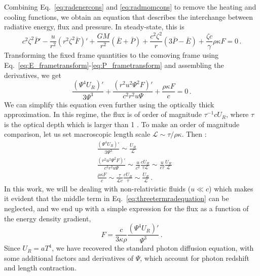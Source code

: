 \documentclass[../main.tex]{subfiles}
\begin{document}
Combining Eq.~\eqref{eq:radenercons} and \eqref{eq:radmomcons} to remove the heating and cooling functions, we obtain an equation that describes the interchange between radiative energy, flux and pressure. In steady-state, this is
\begin{equation}
    c^2\zeta^2\bar{P}'-\frac{u}{r^2}(r^2\zeta^2\bar{F})'
    +\frac{GM}{r^2}(\bar{E}+\bar{P})+\frac{c^2\zeta^2}{r}(3\bar{P}-\bar{E})+\frac{\zeta c}{\gamma}\rho\kappa F=0\,.
\end{equation}
Transforming the fixed frame quantities to the comoving frame using Eq.~\eqref{eq:E_frametransform}-\eqref{eq:P_frametransform} and assembling the derivatives, we get
\begin{equation}\label{eq:threetermradequation}
    \frac{(\Psi^4U_R)'}{3\Psi^3}+\frac{(r^2u^2\Psi^2F)'}{c^2r^2u\Psi}+\frac{\rho\kappa F}{c}=0 \,.
\end{equation}
We can simplify this equation even further using the optically thick approximation. In this regime, the flux is of order of magnitude $\tau^{-1}cU_R$, where $\tau$ is the optical depth which is larger than 1 \citep{Thorne1981}. To make an order of magnitude comparison, let us set macroscopic length scale $\mathscr{L}\sim \tau/\rho\kappa$.  Then :
\begin{align}
    &\frac{(\Psi^4U_R)'}{3\Psi^3} \sim \frac{U_R}{\mathscr{L}}\\
    &\frac{(r^2u^2\Psi^2F)'}{c^2r^2u\Psi} \sim \frac{u}{c^2}\frac{cU_R}{\tau\mathscr{L}}\sim\frac{u}{c\tau}\frac{U_R}{\mathscr{L}}\\
    &\frac{\rho\kappa F}{c}\sim\frac{\tau}{\mathscr{L}c}\frac{cU_R}{\tau}\sim\frac{U_R}{\mathscr{L}} \,.
\end{align}
In this work, we will be dealing with non-relativistic fluids ($u\ll c$) which makes it evident that the middle term in Eq.~\eqref{eq:threetermradequation} can be neglected, and we end up with a simple expression for the flux as a function of the energy density gradient,
\begin{equation}\label{eq:photondiffusion}
    \boxed{F=\frac{c}{3\kappa\rho}\frac{(\Psi^4U_R)'}{\Psi^3}}\,.
\end{equation}
Since $U_R=aT^4$, we have recovered the standard photon diffusion equation, with some additional factors and derivatives of $\Psi$, which account for photon redshift and length contraction.\\
\end{document}
